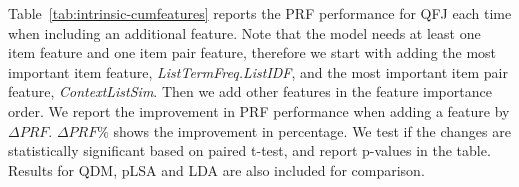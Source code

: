 
Table~\ref{tab:intrinsic-cumfeatures} reports the PRF performance for QFJ each time when including an additional feature. Note that the model needs at least one item feature and one item pair feature, therefore we start with adding the most important item feature, \textit{ListTermFreq.ListIDF}, and the most important item pair feature, \textit{ContextListSim}. Then we add other features in the feature importance order. We report the improvement in PRF performance when adding a feature by $\Delta{PRF}$. $\Delta{PRF}\%$ shows the improvement in percentage. We test if the changes are statistically significant based on paired t-test, and report p-values in the table. Results for QDM, pLSA and LDA are also included for comparison.

